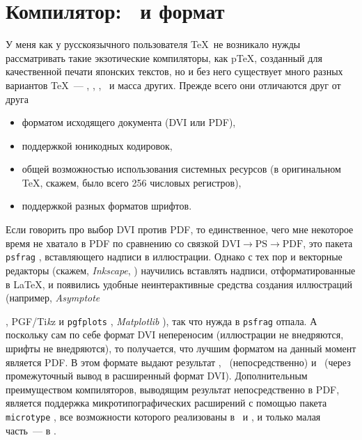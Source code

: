 \documentclass[a4paper,12pt,hyphens]{article}
\newcommand\softname[1]{\textit{#1}}
\newcommand\package[1]{\texttt{#1}}
\begin{document}
\section{Компилятор: \LuaTeX\ и формат \LuaLaTeX}
У меня как у русскоязычного пользователя \TeX\ не возникало нужды рассматривать
такие экзотические компиляторы, как p\TeX, созданный для качественной печати японских
текстов, но и без него существует много разных вариантов \TeX\ --- \eTeX, \pdfTeX,
\XeTeX, \LuaTeX\ и масса других. Прежде всего они отличаются
друг от друга
\begin{itemize}
\item форматом исходящего документа (DVI или PDF),
\item поддержкой юникодных кодировок,
\item общей возможностью использования системных ресурсов (в оригинальном \TeX,
скажем, было всего 256 числовых регистров),
\item поддержкой разных форматов шрифтов.
\end{itemize}

Если говорить про выбор DVI против PDF, то единственное, чего мне некоторое время
не хватало в PDF по сравнению со связкой $\text{DVI}\to\text{PS}\to\text{PDF}$,
это пакета \package{psfrag} \parencite{ctan-psfrag}, вставляющего надписи в иллюстрации. Однако с тех
пор и векторные редакторы (скажем, \softname{Inkscape}, \cite{site-inkscape})
научились вставлять надписи,
отформатированные в \LaTeX, и появились удобные неинтерактивные средства создания
иллюстраций (например, \softname{Asymptote}
\begin{otherlanguage}{english}\parencite{site-asymptote,ctan-asymptote}\end{otherlanguage},
PGF/Ti\emph{k}z \parencite{ctan-pgf} и \package{pgfplots} \parencite{ctan-pgfplots},
\softname{Matplotlib} \parencite{site-matplotlib}), так что нужда в \package{psfrag}
отпала. А поскольку сам по себе формат DVI непереносим (иллюстрации не
внедряются, шрифты не внедряются), то получается, что лучшим форматом на данный
момент является PDF. В этом формате выдают результат \pdfTeX, \LuaTeX\ (непосредственно)
и \XeTeX\ (через промежуточный вывод в расширенный формат DVI).
Дополнительным преимуществом компиляторов, выводящим результат непосредственно в PDF,
является поддержка микротипографических расширений с помощью пакета
\package{microtype} \parencite{ctan-microtype}, все возможности которого реализованы в
\pdfTeX\ и \LuaTeX, и только малая часть~--- в \XeTeX.
\end{document}
